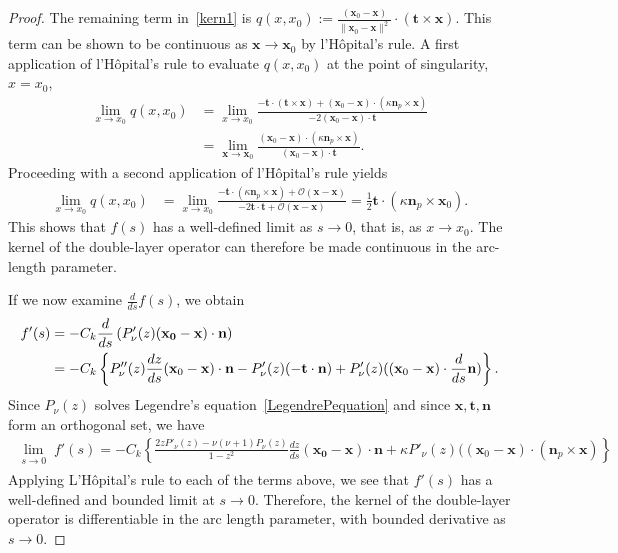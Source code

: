 \begin{proof}
The remaining term in~\eqref{kern1} is $q(x,x_0) :=
\frac{(\mathbf{x}_{0}-\mathbf{x})}{\|\mathbf{x}_{0}-\mathbf{x}\|^2}
\cdot \left( \mathbf{t} \times \mathbf{x} \right).$  This term can be
shown to be continuous as $\mathbf{x} \rightarrow \mathbf{x}_{0}$ by
l'H\^{o}pital's rule.  A first application of l'H\^{o}pital's rule to
evaluate $q(x,x_0)$ at the point of singularity, $x = x_{0}$, 
\begin{align*}
  \lim_{x \rightarrow x_{0}}q(x,x_{0}) & = 
  \lim_{x \rightarrow x_{0}} 
  \frac{ -\mathbf{t} \cdot \left(\mathbf{t} \times \mathbf{x} \right)
  + (\mathbf{x}_{0}-\mathbf{x}) \cdot \left( \kappa \mathbf{n}_{p}
  \times \mathbf{x} \right)}
  {-2(\mathbf{x}_{0} - \mathbf{x}) \cdot \mathbf{t}} \\
  & = \lim_{\mathbf{x} \rightarrow \mathbf{x}_{0}} 
  \frac{(\mathbf{x}_{0}-\mathbf{x}) \cdot \left(
  \kappa\mathbf{n}_{p} \times \mathbf{x}\right)}
  {(\mathbf{x}_{0} - \mathbf{x}) \cdot \mathbf{t}}. 
\end{align*}
Proceeding with a second application of l'H\^{o}pital's rule yields
\begin{align*}
  \lim_{x \rightarrow x_{0}} q(x,x_0)  
  & = \lim_{x \rightarrow x_{0}} \frac{-\mathbf{t} \cdot 
  \left( \kappa \mathbf{n}_{p} \times \mathbf{x} \right) +
  \mathcal{O}(\mathbf{x}-\mathbf{x})}
  {-2\mathbf{t} \cdot \mathbf{t} + \mathcal{O}(\mathbf{x}-\mathbf{x})}
  = \frac{1}{2} \mathbf{t} \cdot \left( \kappa \mathbf{n}_{p} \times 
  \mathbf{x}_{0} \right).
\end{align*}
This shows that $f(s)$ has a well-defined limit as $s\rightarrow 0$,
that is, as $x \rightarrow x_0$. The kernel of the double-layer
operator can therefore be made continuous in the arc-length parameter.

If we now examine $\frac{d}{ds}f(s)$, we obtain
\begin{align*} 
  f'(s)&= -C_k \frac{d}{ds}\left( P'_\nu(z)(\mathbf{x_0}-\mathbf{x}) \cdot 
    \mathbf{n} \right) \\
  &=-C_{k} \left\{P''_{\nu}(z) \frac{dz}{ds}
    (\mathbf{x}_{0}-\mathbf{x})  \cdot \mathbf{n} - P'_{\nu}(z)
    (-\mathbf{t} \cdot \mathbf{n}) + P'_\nu(z)((\mathbf{x}_{0} -
    \mathbf{x}) \cdot \frac{d}{ds}\mathbf{n})\right\}.
 \end{align*}
Since $P_\nu(z)$ solves Legendre's equation~\eqref{LegendrePequation}
and since $\mathbf{x},\mathbf{t}, \mathbf{n}$ form an orthogonal set,
we have
\begin{align*}
  \lim_{\substack {s \rightarrow 0}} f'(s) =-C_k
  \left\{\frac{2zP'_{\nu}(z)-\nu(\nu+1)P_{\nu}(z)}{1-z^2}
  \frac{dz}{ds}(\mathbf{x_0}-\mathbf{x})\cdot \mathbf{n} + \kappa
  P'_\nu(z)((\mathbf{x}_{0}-\mathbf{x})\cdot (\mathbf{n}_{p} \times 
  \mathbf{x})\right\}
\end{align*}
Applying L'H\^{o}pital's rule to each of the terms above, we see that
$f'(s)$ has a well-defined and bounded limit at $s \rightarrow 0$.
Therefore, the kernel of the double-layer operator is differentiable in
the arc length parameter, with bounded derivative as $s \rightarrow 0$. 


\end{proof}
